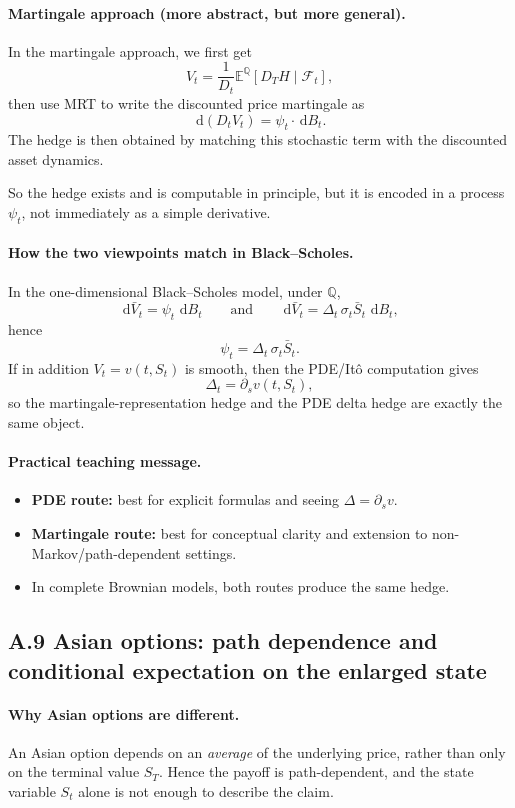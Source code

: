 \documentclass[11pt]{article}
\newcommand{\Qbb}{\mathbb{Q}}
\newcommand{\E}{\mathbb{E}}
\newcommand{\dd}{\,\mathrm{d}}
\newcommand{\1}{\mathbf{1}}
\begin{document}
\paragraph{Martingale approach (more abstract, but more general).}
In the martingale approach, we first get
$$
V_t=\frac{1}{D_t}\E^{\Qbb}[D_T H\mid \mathcal F_t],
$$
then use MRT to write the discounted price martingale as
$$
\dd(D_tV_t)=\psi_t\cdot \dd B_t.
$$
The hedge is then obtained by matching this stochastic term with the discounted asset dynamics.

So the hedge exists and is computable in principle, but it is encoded in a process \(\psi_t\), not immediately as a simple derivative.

\paragraph{How the two viewpoints match in Black--Scholes.}
In the one-dimensional Black--Scholes model, under \(\Qbb\),
$$
\dd \bar V_t=\psi_t\,\dd B_t
\qquad\text{and}\qquad
\dd \bar V_t=\Delta_t\,\sigma_t \bar S_t\,\dd B_t,
$$
hence
$$
\psi_t=\Delta_t\,\sigma_t \bar S_t.
$$
If in addition \(V_t=v(t,S_t)\) is smooth, then the PDE/It\^o computation gives
$$
\Delta_t=\partial_s v(t,S_t),
$$
so the martingale-representation hedge and the PDE delta hedge are exactly the same object.

\paragraph{Practical teaching message.}
\begin{itemize}[leftmargin=1.4em]
    \item \textbf{PDE route:} best for explicit formulas and seeing \(\Delta=\partial_s v\).
    \item \textbf{Martingale route:} best for conceptual clarity and extension to non-Markov/path-dependent settings.
    \item In complete Brownian models, both routes produce the same hedge.
\end{itemize}


\subsection*{A.9 Asian options: path dependence and conditional expectation on the enlarged state}

\paragraph{Why Asian options are different.}
An Asian option depends on an \emph{average} of the underlying price, rather than only on the terminal value \(S_T\).
Hence the payoff is path-dependent, and the state variable \(S_t\) alone is not enough to describe the claim.
\end{document}
